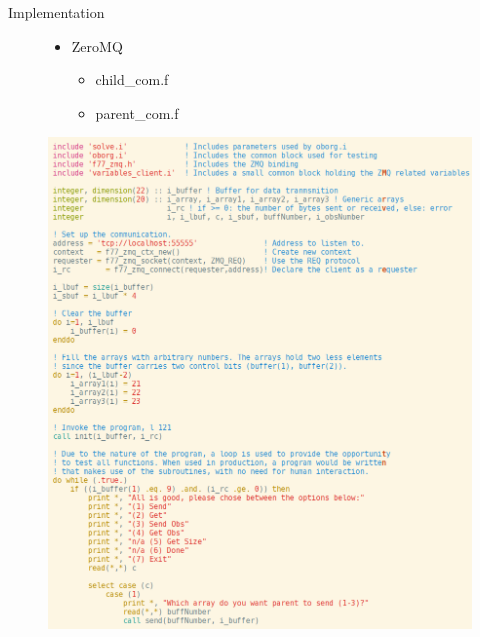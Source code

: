 \documentclass{beamer}
\begin{document}
    \begin{frame}{Implementation}
        \begin{figure}[h!]
        \centering
        \begin{minipage}{.5\columnwidth}
            \begin{itemize}
                \item ZeroMQ
                \pause
                \begin{itemize}[<+-|alert@+>]
                    \item child\_com.f
                    \item parent\_com.f
                \end{itemize}
            \end{itemize}
        \end{minipage}%
        \begin{minipage}{.5\columnwidth}
            \centering
            \includegraphics[width=1\columnwidth]{child_com}
        \end{minipage}
        \end{figure}
    \end{frame}
\end{document}
